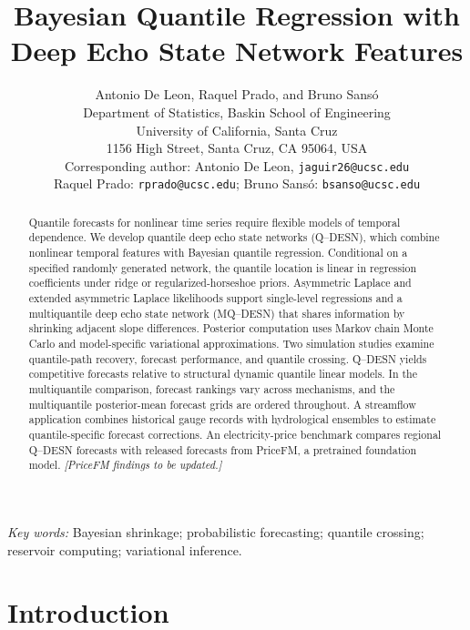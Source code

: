 \documentclass[12pt,letterpaper]{article}
\title{Bayesian Quantile Regression with\\Deep Echo State Network Features}
\author{}
\author{Antonio De Leon, Raquel Prado, and Bruno Sans\'o\\
Department of Statistics, Baskin School of Engineering\\
University of California, Santa Cruz\\
1156 High Street, Santa Cruz, CA 95064, USA\\[0.5em]
Corresponding author: Antonio De Leon, \texttt{jaguir26@ucsc.edu}\\
Raquel Prado: \texttt{rprado@ucsc.edu}; Bruno Sans\'o: \texttt{bsanso@ucsc.edu}}
\date{}
\makeatletter
\newif\ifQdesnAnonymous
\numberwithin{equation}{section}
\renewcommand{\maketitle}{%
  \ifQdesnAnonymous
    \begin{center}\bfseries\@title\end{center}%
  \else
    \hypersetup{pageanchor=false}%
    \begin{titlepage}
    \begin{center}\bfseries\@title\par\medskip\normalfont\@author\par\end{center}
    \end{titlepage}%
    \hypersetup{pageanchor=true}%
  \fi
}
\makeatother
\begin{document}
\maketitle

\begin{abstract}
\normalsize
\noindent
Quantile forecasts for nonlinear time series require flexible models of temporal
dependence. We develop quantile deep echo state networks (Q--DESN), which
combine nonlinear temporal features with Bayesian quantile regression.
Conditional on a specified randomly generated network, the quantile location
is linear in regression coefficients under ridge or regularized-horseshoe
priors. Asymmetric Laplace and extended asymmetric Laplace likelihoods support
single-level regressions and a multiquantile deep echo state network
(MQ--DESN) that shares information by shrinking adjacent slope differences.
Posterior computation
uses Markov chain Monte Carlo and model-specific variational approximations.
Two simulation studies examine quantile-path recovery, forecast performance,
and quantile crossing. Q--DESN yields competitive forecasts relative to
structural dynamic quantile linear models. In the multiquantile comparison,
forecast rankings vary across mechanisms, and the multiquantile
posterior-mean forecast grids are ordered throughout. A streamflow application
combines historical gauge records with hydrological ensembles to estimate
quantile-specific forecast corrections. An electricity-price benchmark compares
regional Q--DESN forecasts with released forecasts from PriceFM, a pretrained
foundation model.
\textit{[PriceFM findings to be updated.]}
\end{abstract}

\noindent\textit{Key words:} Bayesian shrinkage; probabilistic forecasting;
quantile crossing; reservoir computing; variational inference.

\bigskip

\section{Introduction}
\label{sec:intro}
\end{document}
